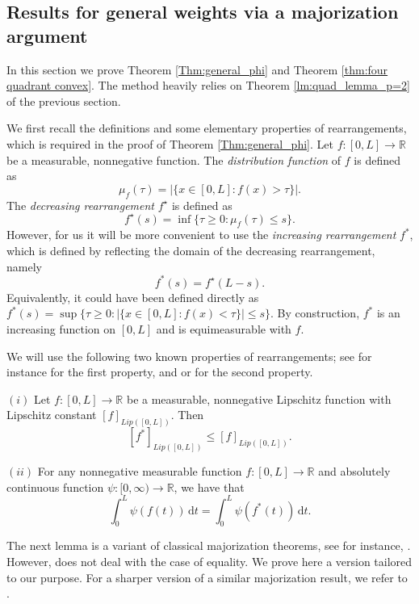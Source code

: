 \documentclass[10pt,leqno]{amsart}
\newcommand{\R}[0]{\mathbb{R}}
\newcommand{\dd}{\, \mathrm{d}}
\numberwithin{Theorem}{section}
\theoremstyle{definition}
\theoremstyle{remark}
\numberwithin{equation}{section}
\numberwithin{equation}{section}
\begin{document}
\subsection{Results for general weights via a majorization argument}
\label{section:majorization}



In this section we prove Theorem \ref{Thm:general_phi} and Theorem \ref{thm:four quadrant convex}. The method heavily relies on Theorem \ref{lm:quad_lemma_p=2} of the previous section.

We first recall the definitions and some elementary properties of rearrangements, which is required in the proof of Theorem \ref{Thm:general_phi}.
    Let $f: [0, L] \to \mathbb{R}$ be a measurable, nonnegative function. The \textit{distribution function} of $f$ is defined as
    $$\mu_f(\tau) = |\{x \in [0, L] : f(x) > \tau\}|.$$
    The \textit{decreasing rearrangement} $f^{\star}$ is defined as
    $$f^{\star}(s) = \inf\{\tau \ge 0 : \mu_f(\tau) \le s\}.$$
    However, for us it will be more convenient to use the  \textit{increasing rearrangement} $f^*$, which is defined by reflecting the domain of the decreasing rearrangement, namely
    $$f^*(s) = f^{\star}(L - s).$$
    Equivalently, it could have been defined directly as $f^*(s) = \sup\{\tau \ge 0 : |\{x \in [0,L] : f(x) < \tau\}| \le s\}$. By construction, $f^*$ is an increasing function on $[0, L]$ and is equimeasurable with $f$.


We will use the following two known properties of rearrangements; see for instance \cite{Baernstein} for the first property,  and \cite[p. 81, Chapter 3]{lieb2001analysis} or \cite[p. 277]{hardy1952inequalities} for the second property.

$(i)$ Let $f: [0, L] \to \mathbb{R}$ be a measurable, nonnegative Lipschitz function with Lipschitz constant $[f]_{Lip([0,L])}$. Then
    \begin{equation} \label{lm:rearrange_is_lip}
    [f^*]_{Lip([0,L])}\leq  [f]_{Lip([0,L])}.
    \end{equation}


$(ii)$ For any nonnegative measurable function $f:[0,L] \to \R$ and absolutely continuous function $\psi:[0,\infty) \to \R$, we have that
    \begin{equation}\label{eq:invar integ under rearr}
       \int_0^L \psi(f(t)) \dd t = \int_0^L \psi(f^*(t)) \dd t.
    \end{equation}



The next lemma is a variant of classical majorization theorems, see  for instance, \cite[Theorem D.2 page 22, Proposition E.4 page 751]{Marshall}. However, \cite{Marshall} does not deal with the case of equality. We prove here a version tailored to our purpose. For a sharper version of a similar majorization result, we refer to \cite[Theorem 2.3]{Chong}.
\end{document}

